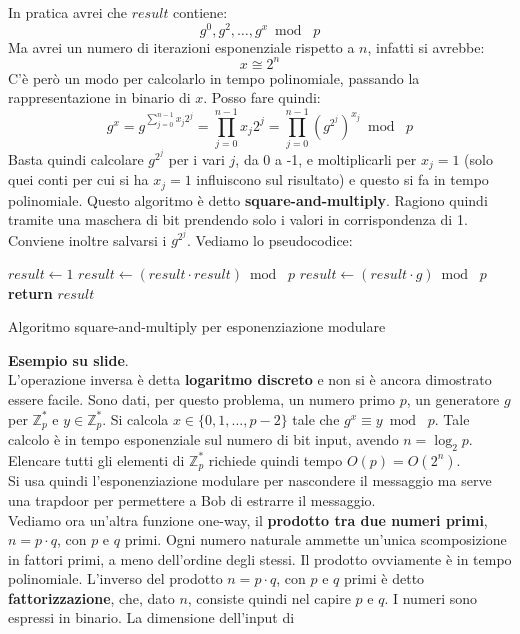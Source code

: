 \documentclass[a4paper,12pt, oneside]{book}
\begin{document}
In pratica avrei che $result$ contiene:
\[g^0,g^2,\ldots,g^x\bmod\,\,p\]
Ma avrei un numero di iterazioni esponenziale rispetto a $n$, infatti si
avrebbe: 
\[x\cong 2^n\]
C'è però un modo per calcolarlo in tempo polinomiale, passando la
rappresentazione in binario di $x$. Posso fare quindi:
\[g^x=
  g^{\sum_{j=0}^{n-1}x_j2^j}=\prod_{j=0}^{n-1}x_j2^j=\prod_{j=0}^{n-1}
  (g^{2^j})^{x_j}\bmod \,\,p\] 
Basta quindi calcolare $g^{2^j}$ per i vari $j$, da 0 a -1, e moltiplicarli per
$x_j=1$ (solo quei conti per cui si ha $x_j=1$ influiscono sul risultato) e
questo si fa in tempo polinomiale. Questo algoritmo è detto
\textbf{square-and-multiply}. Ragiono quindi tramite una maschera di bit
prendendo solo i valori in corrispondenza di 1.\\
Conviene inoltre salvarsi i $g^{2^j}$. Vediamo lo pseudocodice:
\begin{algorithm}[H]
  \begin{algorithmic}
    \State $result\gets 1$
    \State $result \gets (result \cdot result)\bmod\,\,p$
    \State $result \gets (result \cdot g)\bmod\,\,p$
    \EndIf
    \EndFor
    \State \textbf{return} $result$ 
    \EndFunction
  \end{algorithmic}
  \caption{Algoritmo square-and-multiply per esponenziazione modulare}
\end{algorithm}
\textbf{Esempio su slide}.\\
L'operazione inversa è detta \textbf{logaritmo discreto} e non si è ancora
dimostrato essere facile. Sono dati, per questo problema, un numero primo $p$,
un generatore $g$ per $\mathbb{Z}_p^*$ e $y\in\mathbb{Z}_p^*$. Si calcola
$x\in\{0,1,\ldots,p-2\}$ tale che $g^x\equiv y\bmod\,\,p$. Tale calcolo è in
tempo esponenziale sul numero di bit input, avendo $n=\log_2p$. Elencare tutti
gli elementi di $\mathbb{Z}_p^*$ richiede quindi tempo $O(p)=O(2^n)$.\\
Si usa quindi l'esponenziazione modulare per nascondere il messaggio ma serve
una trapdoor per permettere a Bob di estrarre il messaggio.\\
Vediamo ora un'altra funzione one-way, il \textbf{prodotto tra due numeri
  primi}, $n=p\cdot q$, con $p$ e $q$ primi. Ogni numero naturale ammette
un'unica scomposizione in fattori primi, 
a meno dell'ordine degli stessi. Il prodotto ovviamente è in tempo polinomiale.
L'inverso del prodotto $n=p\cdot q$, con $p$ e
$q$ primi è detto \textbf{fattorizzazione}, che, dato $n$, consiste quindi nel
capire $p$ e $q$. I numeri sono espressi in binario. La dimensione dell'input di
\end{document}
